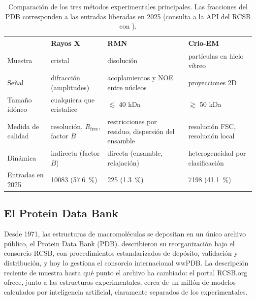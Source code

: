 \begin{table}[t]
\centering\small
\caption[Métodos experimentales de determinación de estructuras]{Comparación de los tres métodos experimentales principales. Las fracciones del PDB corresponden a las entradas liberadas en 2025 (consulta a la API del RCSB con ).}
\label{tab:15-metodos}
\begin{tabularx}{\linewidth}{@{}>{\raggedright\arraybackslash}p{2.0cm}>{\raggedright\arraybackslash}X>{\raggedright\arraybackslash}X>{\raggedright\arraybackslash}X@{}}
\toprule
 & \textbf{Rayos X} & \textbf{RMN} & \textbf{Crio-EM}\\
\midrule
Muestra & cristal & disolución & partículas en hielo vítreo\\
Señal & difracción (amplitudes) & acoplamientos y NOE entre núcleos & proyecciones 2D\\
Tamaño idóneo & cualquiera que cristalice & $\lesssim$ 40 kDa & $\gtrsim$ 50 kDa\\
Medida de calidad & resolución, $R_{\text{free}}$, factor $B$ & restricciones por residuo, dispersión del ensamble & resolución FSC, resolución local\\
Dinámica & indirecta (factor $B$) & directa (ensamble, relajación) & heterogeneidad por clasificación\\
Entradas en 2025 & \num{10083} (\SI{57,6}{\percent}) & \num{225} (\SI{1,3}{\percent}) & \num{7198} (\SI{41,1}{\percent})\\
\bottomrule
\end{tabularx}
\end{table}

\subsection{El Protein Data Bank}

Desde 1971, las estructuras de macromoléculas se depositan en un único archivo público, el Protein Data Bank (PDB). \textcite{c15-berman2000} describieron su reorganización bajo el consorcio RCSB, con procedimientos estandarizados de depósito, validación y distribución, y hoy lo gestiona el consorcio internacional wwPDB. La descripción reciente de \textcite{c15-burley2023} muestra hasta qué punto el archivo ha cambiado: el portal RCSB.org ofrece, junto a las estructuras experimentales, cerca de un millón de modelos calculados por inteligencia artificial, claramente separados de los experimentales.


